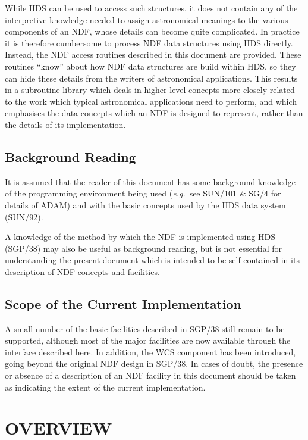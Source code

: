 \documentclass[twoside,11pt]{article}
\newcommand{\xref}[3]{#1}
\newcommand{\xlabel}[1]{}
\newcommand{\st}[1]{{\em{#1}}}
\begin{document}
While HDS can be used to access such structures, it does not contain any of
the interpretive knowledge needed to assign astronomical meanings to the
various components of an NDF, whose details can become quite complicated. 
In practice it is therefore cumbersome to process NDF data structures using
HDS directly. 
Instead, the NDF access routines described in this document are provided.
These routines ``know'' about how NDF data structures are build within HDS,
so they can hide these details from the writers of astronomical
applications.
This results in a subroutine library which deals in higher-level concepts
more closely related to the work which typical astronomical applications
need to perform, and which emphasises the data concepts which an NDF is
designed to represent, rather than the details of its implementation. 

\subsection{\xlabel{background_reading}Background Reading}

It is assumed that the reader of this document has some background
knowledge of the programming environment being used (\st{e.g.}\ see
\xref{SUN/101}{sun101}{} \& \xref{SG/4}{sg4}{} for details of ADAM)
and with the basic concepts used by the HDS data system
(\xref{SUN/92}{sun92}{}).

A knowledge of the method by which the NDF is implemented using HDS
(\xref{SGP/38}{sgp38}{}) may also be useful as background reading, but
is not essential for understanding the present document which is
intended to be self-contained in its description of NDF concepts and
facilities.

\subsection{\xlabel{scope_of_the_current_implementation}Scope of the Current Implementation}

A small number of the basic facilities described in
\xref{SGP/38}{sgp38}{} still remain to be supported, although most of
the major facilities are now available through the interface described
here.  In addition, the WCS component has been introduced, going
beyond the original NDF design in SGP/38.  In cases of doubt, the
presence or absence of a description of an NDF facility in this
document should be taken as indicating the extent of the current
implementation.

\section{\xlabel{overview}OVERVIEW}
\end{document}
